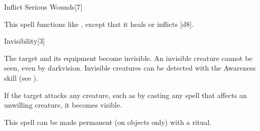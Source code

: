 \begin{spellsection}[Mass]{Inflict Serious Wounds}[7]
    \begin{spellheader}
    \end{spellheader}
    \begin{spellcontent}
        \begin{spelltargetinginfo}
        \end{spelltargetinginfo}
        \begin{spelleffects}
            \spellspecial This spell functions like , except that it heals or inflicts \spelldamage{}[d8].
        \end{spelleffects}
    \end{spellcontent}
    \begin{spellfooter}
        \miscastexplode
    \end{spellfooter}
\end{spellsection}

\begin{spellsection}{Invisibility}[3]
    \begin{spellheader}
    \end{spellheader}
    \begin{spellcontent}
        \begin{spelltargetinginfo}
        \end{spelltargetinginfo}
        \begin{spelleffects}
            \spelleffect The target and its equipment become invisible. An invisible creature cannot be seen, even by darkvision. Invisible creatures can be detected with the Awareness skill (see ).

            If the target attacks any creature, such as by casting any spell that affects an unwilling creature, it becomes visible.
            \spelldur \durshort \dismissable
        \end{spelleffects}
    \end{spellcontent}
    \begin{spellfooter}
        \spellnotes This spell can be made permanent (on objects only) with a  ritual.
        \miscastrandom
    \end{spellfooter}
\end{spellsection}

